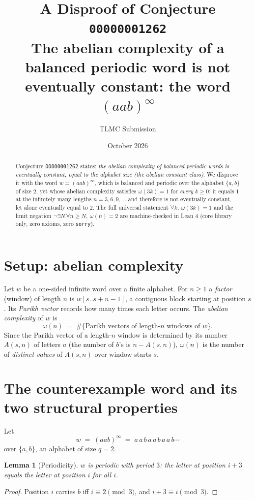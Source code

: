 \documentclass[11pt]{article}
\title{A Disproof of Conjecture \texttt{00000001262}\\
\large The abelian complexity of a balanced periodic word is not eventually
constant: the word $(aab)^\infty$}
\author{TLMC Submission}
\date{October 2026}
\newtheorem{lemma}{Lemma}
\theoremstyle{definition}
\begin{document}
\maketitle

\begin{abstract}
Conjecture \texttt{00000001262} states: \emph{the abelian complexity of balanced
periodic words is eventually constant, equal to the alphabet size (the abelian
constant class)}.  We disprove it with the word $w = (aab)^\infty$, which is
balanced and periodic over the alphabet $\{a,b\}$ of size $2$, yet whose abelian
complexity satisfies $\omega(3k) = 1$ for \emph{every} $k \ge 0$: it equals $1$
at the infinitely many lengths $n = 3, 6, 9, \dots$ and therefore is not
eventually constant, let alone eventually equal to $2$.  The full universal
statement $\forall k,\ \omega(3k) = 1$ and the limit negation
$\neg\exists N\,\forall n \ge N,\ \omega(n) = 2$ are machine-checked in Lean 4
(core library only, zero axioms, zero \texttt{sorry}).
\end{abstract}

\section{Setup: abelian complexity}

Let $w$ be a one-sided infinite word over a finite alphabet. For $n \ge 1$ a
\emph{factor} (window) of length $n$ is $w[s..s+n-1]$, a contiguous block
starting at position $s$. Its \emph{Parikh vector} records how many times each
letter occurs. The \emph{abelian complexity} of $w$ is
\[
\omega(n) \;=\; \#\{\text{Parikh vectors of length-}n\text{ windows of } w\}.
\]
Since the Parikh vector of a length-$n$ window is determined by its number
$A(s,n)$ of letters $a$ (the number of $b$'s is $n - A(s,n)$), $\omega(n)$ is
the number of \emph{distinct values} of $A(s,n)$ over window starts $s$.

\section{The counterexample word and its two structural properties}

Let
\[
w \;=\; (aab)^\infty \;=\; a\,a\,b\,a\,a\,b\,a\,a\,b\cdots
\]
over $\{a, b\}$, an alphabet of size $q = 2$.

\begin{lemma}[Periodicity]\label{lem:periodic}
$w$ is periodic with period $3$: the letter at position $i+3$ equals the letter
at position $i$ for all $i$.
\end{lemma}
\begin{proof}
Position $i$ carries $b$ iff $i \equiv 2 \pmod 3$, and $i + 3 \equiv i \pmod 3$.
\end{proof}
\end{document}
